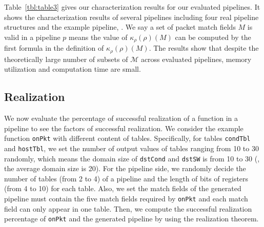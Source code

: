  Table~\ref{tbl:table3} gives our characterization results for our evaluated pipelines. It shows the characterization results of several pipelines including four real pipeline structures and the example pipeline, \exampledp. We say a set of packet match fields $M$ is valid in a pipeline $p$ means the value of $\kappa_\rho(\rho)(M)$ can be computed by the first formula in the definition of $\kappa_\rho(\rho)(M)$. The results show that despite the theoretically large number of subsets of $\mathcal{M}$ across evaluated pipelines, memory utilization and computation time are small.

\begin{table}[t]
\centering
{}
\vspace{2mm}
\caption{Characterization results of pipelines.}
\label{tbl:table3}
\end{table}

\subsection{Realization}

We now evaluate the percentage of successful realization of a function in a pipeline to see the factors of successful realization. We consider the example function \texttt{onPkt} with different content of tables. Specifically, for tables \texttt{condTbl} and \texttt{hostTbl}, we set the number of output values of tables ranging from 10 to 30 randomly, which means the domain size of \texttt{dstCond} and \texttt{dstSW} is from 10 to 30 (\ie, the average domain size is 20). For the pipeline side, we randomly decide the number of tables (from 2 to 4) of a pipeline and the length of bits of registers (from 4 to 10) for each table. Also, we set the match fields of the generated pipeline must contain the five match fields required by \texttt{onPkt} and each match field can only appear in one table. Then, we compute the successful realization percentage of \texttt{onPkt} and the generated pipeline by using the realization theorem.

